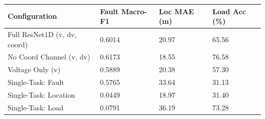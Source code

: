 \begin{tabular}{llll}
\toprule
Configuration & Fault Macro-F1 & Loc MAE (m) & Load Acc (\%) \\
\midrule
Full ResNet1D (v, dv, coord) & 0.6014 & 20.97 & 65.56 \\
No Coord Channel (v, dv) & 0.6173 & 18.55 & 76.58 \\
Voltage Only (v) & 0.5889 & 20.38 & 57.30 \\
Single-Task: Fault & 0.5765 & 33.64 & 31.13 \\
Single-Task: Location & 0.0449 & 18.97 & 31.40 \\
Single-Task: Load & 0.0791 & 36.19 & 73.28 \\
\bottomrule
\end{tabular}
